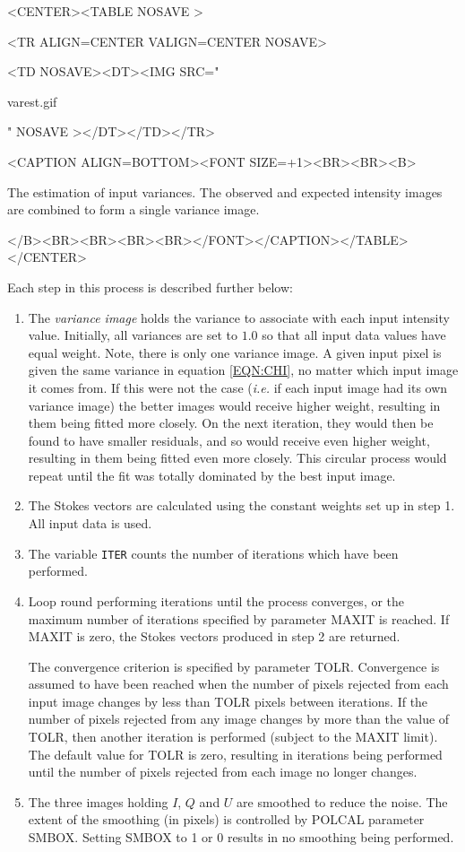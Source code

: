 \documentclass[twoside,11pt]{article}
\renewcommand{\_}{\texttt{\symbol{95}}}
\newcommand{\htmlfig}[3]{
   \label{#1}
   \begin{rawhtml} <CENTER><TABLE NOSAVE > \end{rawhtml}
   \begin{rawhtml} <TR ALIGN=CENTER VALIGN=CENTER NOSAVE> \end{rawhtml}
   \begin{rawhtml} <TD NOSAVE><DT><IMG SRC=" \end{rawhtml}
   #2
   \begin{rawhtml} " NOSAVE ></DT></TD></TR> \end{rawhtml}
   \begin{rawhtml} <CAPTION ALIGN=BOTTOM><FONT SIZE=+1><BR><BR><B> \end{rawhtml}
   #3 
   \begin{rawhtml} </B><BR><BR><BR><BR></FONT></CAPTION></TABLE></CENTER> \end{rawhtml}
}
\begin{document}
\begin{htmlonly}
\htmlfig{fig:varest}{varest.gif}{
The estimation of input variances. The observed and expected
intensity images are combined to form a single variance image.}
\end{htmlonly}

Each step in this process is described further below:

\begin{enumerate}

\item The \emph{variance image} holds the variance to associate with each
input intensity value. Initially, all variances are set to $1.0$ so that
all input data values have equal weight. Note, there is only one variance
image. A given input pixel is given the same variance in equation
\ref{EQN:CHI}, no matter which input image it comes from. If this were
not the case (\emph{i.e.} if each input image had its own variance image)
the better images would receive higher weight, resulting in them being
fitted more closely. On the next iteration, they would then be found to
have smaller residuals, and so would receive even higher weight,
resulting in them being fitted even more closely. This circular process
would repeat until the fit was totally dominated by the best input image. 

\item The Stokes vectors are calculated using the constant weights set up
in step 1. All input data is used.

\item The variable \verb+ITER+ counts the number of iterations which have
been performed. 

\item Loop round performing iterations until the process converges, or
the maximum number of iterations specified by parameter MAXIT is reached. 
If MAXIT is zero, the Stokes vectors produced in step 2 are returned.

The convergence criterion is specified by parameter TOLR. Convergence is
assumed to have been reached when the number of pixels rejected from each
input image changes by less than TOLR pixels between iterations. If the
number of pixels rejected from any image changes by more than the value
of TOLR, then another iteration is performed (subject to the MAXIT limit).
The default value for TOLR is zero, resulting in iterations being
performed until the number of pixels rejected from each image no longer
changes.

\item The three images holding $I$, $Q$ and $U$ are smoothed to reduce
the noise. The extent of the smoothing (in pixels) is controlled by POLCAL 
parameter SMBOX. Setting SMBOX to 1 or 0 results in no smoothing
being performed. 


\end{enumerate}
\end{document}
